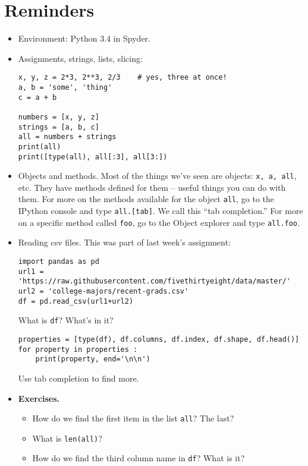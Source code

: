 \documentclass[11pt]{article}
\begin{document}
\section{Reminders}

\begin{itemize}
\item Environment:  Python 3.4 in Spyder.
\item Assignments, strings, lists, slicing:
\begin{verbatim}
x, y, z = 2*3, 2**3, 2/3    # yes, three at once!
a, b = 'some', 'thing'
c = a + b

numbers = [x, y, z]
strings = [a, b, c]
all = numbers + strings
print(all)
print([type(all), all[:3], all[3:])
\end{verbatim}

\item Objects and methods.  Most of the things we've seen are objects:  {\tt x, a, all}, etc.
They have methods defined for them -- useful things you can do with them.
For more on the methods available for the object {\tt all},
go to the IPython console and type {\tt all.[tab]}.
We call this ``tab completion.''
For more on a specific method called {\tt foo},
go to the Object explorer and type {\tt all.foo}.

\item Reading csv files.
This was part of last week's assignment:
\begin{verbatim}
import pandas as pd
url1 = 'https://raw.githubusercontent.com/fivethirtyeight/data/master/'
url2 = 'college-majors/recent-grads.csv'
df = pd.read_csv(url1+url2)
\end{verbatim}
What is {\tt df}?  What's in it?
\begin{verbatim}
properties = [type(df), df.columns, df.index, df.shape, df.head()]
for property in properties :
    print(property, end='\n\n')
\end{verbatim}
Use tab completion to find more.


\item {\bf Exercises.}
\begin{itemize}
\item How do we find the first item in the list {\tt all}?  The last?
\item What is {\tt len(all)}?
\item How do we find the third column name in {\tt df}?  What is it?
\end{itemize}

\end{itemize}
\end{document}
